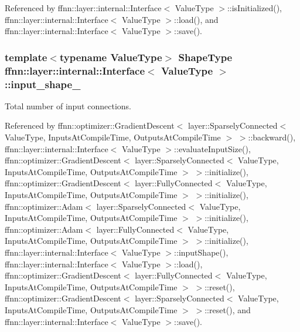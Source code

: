 Referenced by ffnn\-::layer\-::internal\-::\-Interface$<$ Value\-Type $>$\-::is\-Initialized(), ffnn\-::layer\-::internal\-::\-Interface$<$ Value\-Type $>$\-::load(), and ffnn\-::layer\-::internal\-::\-Interface$<$ Value\-Type $>$\-::save().

\hypertarget{classffnn_1_1layer_1_1internal_1_1_interface_a3b9f183881a6aed198c566ecbf0177f7}{
\subsubsection[{input\-\_\-shape\-\_\-}]{\setlength{\rightskip}{0pt plus 5cm}template$<$typename Value\-Type$>$ {\bf Shape\-Type} {\bf ffnn\-::layer\-::internal\-::\-Interface}$<$ Value\-Type $>$\-::input\-\_\-shape\-\_\-\hspace{0.3cm}{\ttfamily [protected]}}}\label{classffnn_1_1layer_1_1internal_1_1_interface_a3b9f183881a6aed198c566ecbf0177f7}


Total number of input connections. 



Referenced by ffnn\-::optimizer\-::\-Gradient\-Descent$<$ layer\-::\-Sparsely\-Connected$<$ Value\-Type, Inputs\-At\-Compile\-Time, Outputs\-At\-Compile\-Time $>$ $>$\-::backward(), ffnn\-::layer\-::internal\-::\-Interface$<$ Value\-Type $>$\-::evaluate\-Input\-Size(), ffnn\-::optimizer\-::\-Gradient\-Descent$<$ layer\-::\-Sparsely\-Connected$<$ Value\-Type, Inputs\-At\-Compile\-Time, Outputs\-At\-Compile\-Time $>$ $>$\-::initialize(), ffnn\-::optimizer\-::\-Gradient\-Descent$<$ layer\-::\-Fully\-Connected$<$ Value\-Type, Inputs\-At\-Compile\-Time, Outputs\-At\-Compile\-Time $>$ $>$\-::initialize(), ffnn\-::optimizer\-::\-Adam$<$ layer\-::\-Sparsely\-Connected$<$ Value\-Type, Inputs\-At\-Compile\-Time, Outputs\-At\-Compile\-Time $>$ $>$\-::initialize(), ffnn\-::optimizer\-::\-Adam$<$ layer\-::\-Fully\-Connected$<$ Value\-Type, Inputs\-At\-Compile\-Time, Outputs\-At\-Compile\-Time $>$ $>$\-::initialize(), ffnn\-::layer\-::internal\-::\-Interface$<$ Value\-Type $>$\-::input\-Shape(), ffnn\-::layer\-::internal\-::\-Interface$<$ Value\-Type $>$\-::load(), ffnn\-::optimizer\-::\-Gradient\-Descent$<$ layer\-::\-Fully\-Connected$<$ Value\-Type, Inputs\-At\-Compile\-Time, Outputs\-At\-Compile\-Time $>$ $>$\-::reset(), ffnn\-::optimizer\-::\-Gradient\-Descent$<$ layer\-::\-Sparsely\-Connected$<$ Value\-Type, Inputs\-At\-Compile\-Time, Outputs\-At\-Compile\-Time $>$ $>$\-::reset(), and ffnn\-::layer\-::internal\-::\-Interface$<$ Value\-Type $>$\-::save().

